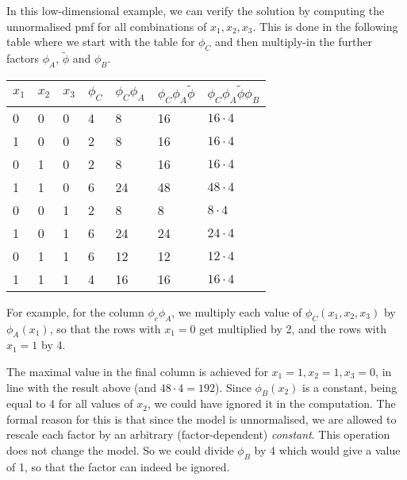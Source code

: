 \begin{exenumerate}
\begin{solution}
    In this low-dimensional example, we can verify the solution by
    computing the unnormalised pmf for all combinations of
    $x_1,x_2,x_3$. This is done in the following table where we start
    with the table for $\phi_C$ and then multiply-in the further
    factors $\phi_A$, $\tilde{\phi}$ and $\phi_B$. 
    \begin{center}
      \begin{tabular}{lllllll}
        \toprule
        $x_1$ & $x_2$ & $x_3$ & $\phi_C$ & $\phi_C \phi_A$ & $\phi_C \phi_A\tilde{\phi}$& $\phi_C \phi_A\tilde{\phi}\phi_B$ \\
        \midrule
        0 & 0 & 0 & 4 & 8 & 16 & $16\cdot 4$\\
        1 & 0 & 0 & 2 & 8 & 16 & $16 \cdot 4$\\
        0 & 1 & 0 & 2 & 8 & 16 & $16\cdot 4$\\
        1 & 1 & 0 & 6 & 24& 48 & $48 \cdot 4$\\
        0 & 0 & 1 & 2 & 8 & 8  & $8 \cdot 4$\\
        1 & 0 & 1 & 6 & 24 & 24 & $24 \cdot 4$\\
        0 & 1 & 1 & 6 & 12 & 12 & $12 \cdot 4$\\
        1 & 1 & 1 & 4 & 16 & 16 & $16\cdot 4$\\
        \bottomrule
      \end{tabular}
    \end{center}
    For example, for the column $\phi_c \phi_A$, we multiply each
    value of $\phi_C(x_1, x_2, x_3)$ by $\phi_A(x_1)$, so that the
    rows with $x_1=0$ get multiplied by 2, and the rows with $x_1=1$
    by 4.

    The maximal value in the final column is achieved for $x_1=1,
    x_2=1, x_3=0$, in line with the result above (and $48\cdot 4 =
    192$). Since $\phi_B(x_2)$ is a constant, being equal to 4 for all
    values of $x_2$, we could have ignored it in the computation. The
    formal reason for this is that since the model is unnormalised, we
    are allowed to rescale each factor by an arbitrary
    (factor-dependent) \emph{constant}. This operation does not change
    the model. So we could divide $\phi_B$ by 4 which would give a
    value of 1, so that the factor can indeed be ignored.
   

\end{solution}
\end{exenumerate}
